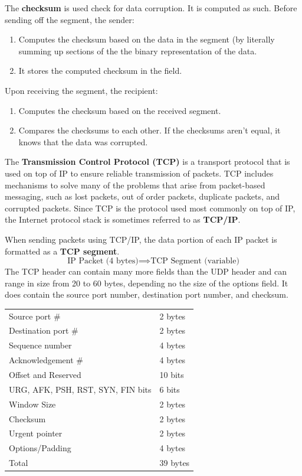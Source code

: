 \documentclass{article}
\begin{document}
  The \textbf{checksum} is used check for data corruption. It is computed as such. Before sending off the segment, the sender: 
  \begin{enumerate}
      \item Computes the checksum based on the data in the segment (by literally summing up sections of the the binary representation of the data. 
      \item It stores the computed checksum in the field. 
  \end{enumerate}
  Upon receiving the segment, the recipient: 
  \begin{enumerate}
      \item Computes the checksum based on the received segment. 
      \item Compares the checksums to each other. If the checksums aren't equal, it knows that the data was corrupted. 
  \end{enumerate}

  The \textbf{Transmission Control Protocol (TCP)} is a transport protocol that is used on top of IP to ensure reliable transmission of packets. TCP includes mechanisms to solve many of the problems that arise from packet-based messaging, such as lost packets, out of order packets, duplicate packets, and corrupted packets. Since TCP is the protocol used most commonly on top of IP, the Internet protocol stack is sometimes referred to as \textbf{TCP/IP}.  

  When sending packets using TCP/IP, the data portion of each IP packet is formatted as a \textbf{TCP segment}. 
  \begin{equation}
    \text{IP Packet (4 bytes)} \implies \text{TCP Segment (variable)}
  \end{equation}
  The TCP header can contain many more fields than the UDP header and can range in size from 20 to 60 bytes, depending no the size of the options field. It does contain the source port number, destination port number, and checksum. 
  \begin{center}
  \begin{tabular}{l|l}
      Source port \# & 2 bytes \\
      Destination port \# & 2 bytes \\
      Sequence number & 4 bytes \\
      Acknowledgement \# & 4 bytes \\
      Offset and Reserved & 10 bits \\
      URG, AFK, PSH, RST, SYN, FIN bits & 6 bits \\
      Window Size & 2 bytes \\
      Checksum & 2 bytes \\
      Urgent pointer & 2 bytes \\
      Options/Padding & 4 bytes \\
      \hline 
      Total & 39 bytes
  \end{tabular}
  \end{center}
\end{document}
